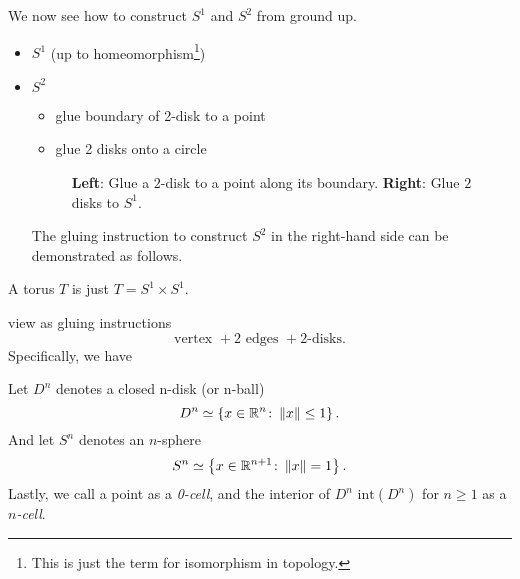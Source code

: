 \begin{eg}
	We now see how to construct \(S^1\) and \(S^2\) from ground up.
	\begin{itemize}
		\item \(S^1\) (up to homeomorphism\footnote{This is just the term for isomorphism in topology.})
		      \begin{figure}[H]
			      \centering
			      \label{fig:eg:constructing-sphere-1}
		      \end{figure}
		\item \(S^2\)
		      \begin{itemize}
			      \item glue boundary of 2-disk to a point
			      \item glue 2 disks onto a circle
		      \end{itemize}
		      \begin{figure}[H]
			      \centering
			      \caption{\textbf{Left}: Glue a \(2\)-disk to a point along its boundary. \textbf{Right}: Glue \(2\) disks to \(S^1\).}
			      \label{fig:eg:constructing-sphere-2}
		      \end{figure}
		      The gluing instruction to construct \(S^2\) in the right-hand side can be demonstrated as follows.
		      \begin{figure}[H]
			      \centering
			      \label{fig:eg:constructing-sphere-2-gluing-instr}
		      \end{figure}
	\end{itemize}
\end{eg}
\begin{eg}
	A torus \(T\) is just \(T = S^1 \times S^1\).
	\begin{figure}[H]
		\centering
		\label{fig:eg:constructing-torus}
	\end{figure}
	view as gluing instructions
	\[
		\text{vertex }+ 2 \text{ edges }+2\text{-disks}.
	\]
	Specifically, we have
	\begin{figure}[H]
		\centering
		\label{fig:eg:constructing-torus-gluing-instr}
	\end{figure}
\end{eg}


\begin{notation}
	Let \(D^n\) denotes a closed n-disk (or n-ball)
	\[
		D^n\simeq \left\{x\in\mathbb{\MakeUppercase{R}} ^n\colon \left\lVert x\right\rVert \leq 1\right\}.
	\]
	And let \(S^n\) denotes an \(n\)-sphere
	\[
		S^n\simeq \left\{x\in \mathbb{\MakeUppercase{R}}^{n+1}\colon \left\lVert x\right\rVert = 1\right\}.
	\]
	Lastly, we call a point as a \emph{0-cell}, and the interior of \(D^n\) \(\mathrm{int}(D^n)\) for \(n\geq 1\) as a \emph{\(n\)-cell}.
\end{notation}

